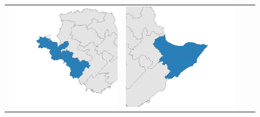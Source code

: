 \begin{figure}[p]
\begin{tabularx}{1\textwidth}{XXXX}
\includegraphics[width=1\linewidth]{images/ch6/mergefocus/17}&
\includegraphics[width=1\linewidth]{images/ch6/mergefocus/24}&

\end{tabularx}
\end{figure}
